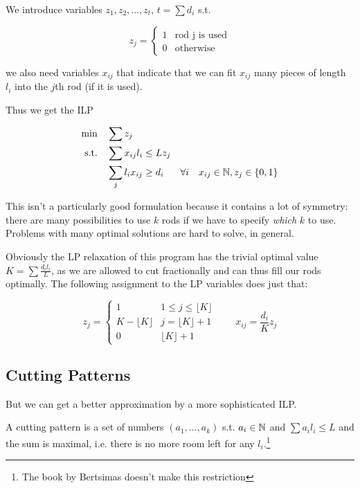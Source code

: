 We introduce variables $z_1,z_2,\ldots , z_t$, $t = \sum d_i$ s.t. 

\[z_j=\begin{cases} 1 & \text{rod j is used}\\
0 & \text{otherwise}\end{cases}\]

we also need variables $x_{ij}$ that indicate that we can fit $x_{ij}$ many pieces of length $l_i$ into the $j$th rod (if it is used).

Thus we get the ILP

\begin{align*}
\min \quad & \sum z_j\\
\text{s.t.} \quad & \sum x_{ij}l_i \leq Lz_j\\
	& \sum_{j} l_ix_{ij} \geq d_i && \forall i
	&x_{ij} \in \mathbb{N}, z_j \in \{0,1\}
\end{align*}

This isn't a particularly good formulation because it contains a lot of symmetry: there are many possibilities to use $k$ rods if we have to specify \emph{which} $k$ to use. Problems with many optimal solutions are hard to solve, in general.

Obviously the LP relaxation of this program has the trivial optimal value $K=\sum \frac{d_il_i}{L}$, as we are allowed to cut fractionally and can thus fill our rods optimally. The following assignment to the LP variables does just that:

\[z_j = \begin{cases}
1 & 1 \leq j \leq \lfloor K\rfloor \\
K-\lfloor K \rfloor & j=\lfloor K\rfloor +1\\
0 & \lfloor K \rfloor +1\end{cases}\qquad x_{ij} = \frac{d_i}{K}z_j\]

\subsection{Cutting Patterns}

But we can get a better approximation by a more sophisticated ILP.

\begin{Def} A cutting pattern is a set of numbers $(a_1,\ldots,a_k)$ s.t. $a_i\in \mathbb{N}$ and $\sum a_il_i\leq L$ and the sum is maximal, i.e. there is no more room left for any $l_i$.\footnote{The book by Bertsimas doesn't make this restriction}
\end{Def}

